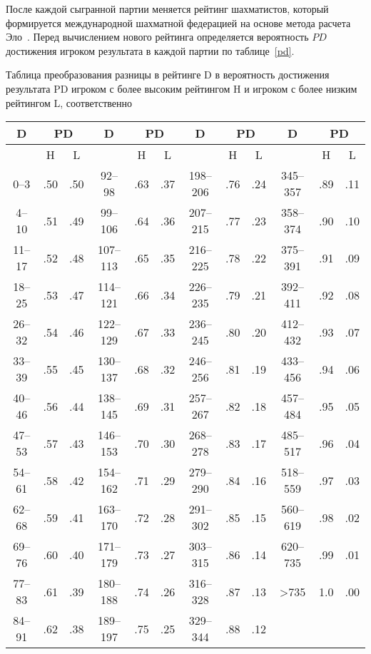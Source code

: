 После каждой сыгранной партии меняется рейтинг шахматистов, который формируется международной шахматной федерацией на основе метода расчета Эло~\cite{fideraiting, elo}.
Перед вычислением нового рейтинга определяется вероятность $PD$ достижения игроком результата в каждой партии по таблице~\ref{pd}.
\begin{center}
	\begin{threeparttable}
		\captionsetup{justification=raggedright,singlelinecheck=off}
		\caption{\label{pd}Таблица преобразования разницы в рейтинге D в вероятность достижения
			результата PD игроком с более высоким рейтингом H и игроком с более низким
			рейтингом L, соответственно}
		\centering
		\begin{tabular}{|c|c|c|c|c|c|c|c|c|c|c|c|}
			\hline
			D & \multicolumn{2}{|c|}{PD} & D & \multicolumn{2}{|c|}{PD} & D & \multicolumn{2}{|c|}{PD} & D & \multicolumn{2}{|c|}{PD} \\
			\hline
			& H & L && H & L && H & L && H & L\\
			\hline
			0--3&.50&.50&92--98&.63&.37&198--206&.76&.24&345--357&.89&.11\\
			\hline
			4--10&.51&.49&99--106&.64&.36&207--215&.77&.23&358--374&.90&.10\\
			\hline
			11--17&.52&.48&107--113&.65&.35&216--225&.78&.22&375--391&.91&.09\\
			\hline
			18--25&.53&.47&114--121&.66&.34&226--235&.79&.21&392--411&.92&.08\\
			\hline
			26--32&.54&.46&122--129&.67&.33&236--245&.80&.20&412--432&.93&.07\\
			\hline
			33--39&.55&.45&130--137&.68&.32&246--256&.81&.19&433--456&.94&.06\\
			\hline
			40--46&.56&.44&138--145&.69&.31&257--267&.82&.18&457--484&.95&.05\\
			\hline
			47--53&.57&.43&146--153&.70&.30&268--278&.83&.17&485--517&.96&.04\\
			\hline
			54--61&.58&.42&154--162&.71&.29&279--290&.84&.16&518--559&.97&.03\\
			\hline
			62--68&.59&.41&163--170&.72&.28&291--302&.85&.15&560--619&.98&.02\\
			\hline
			69--76&.60&.40&171--179&.73&.27&303--315&.86&.14&620--735&.99&.01\\
			\hline
			77--83&.61&.39&180--188&.74&.26&316--328&.87&.13&>735&1.0&.00\\
			\hline
			84--91&.62&.38&189--197&.75&.25&329--344&.88&.12&&&\\
			\hline
		\end{tabular}
	\end{threeparttable}
\end{center}

